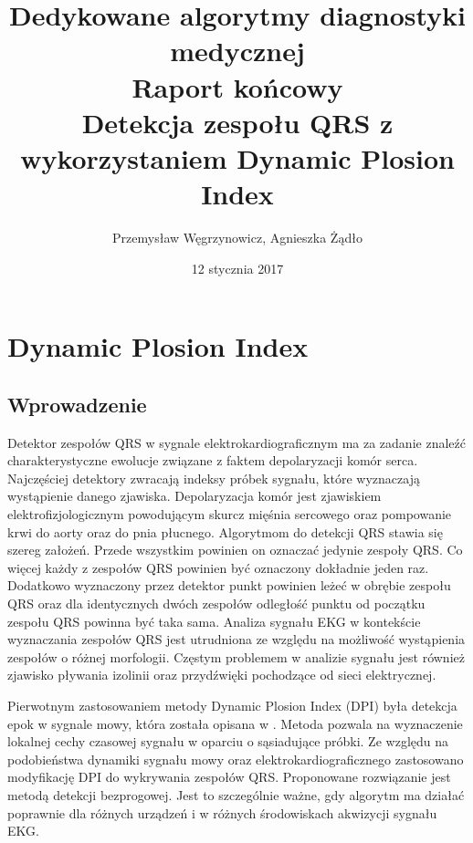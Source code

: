 \documentclass[a4paper,10pt]{article} %
\title{Dedykowane algorytmy diagnostyki medycznej\\
Raport końcowy\\
 Detekcja zespołu QRS z wykorzystaniem Dynamic Plosion Index}
\author{Przemysław Węgrzynowicz, Agnieszka Żądło}
\date{12 stycznia 2017}
\begin{document}
\maketitle

\section{Dynamic Plosion Index}

\subsection{Wprowadzenie}

Detektor zespołów QRS w sygnale elektrokardiograficznym ma za zadanie znaleźć charakterystyczne ewolucje związane z faktem depolaryzacji komór serca. Najczęściej detektory zwracają indeksy próbek sygnału, które wyznaczają wystąpienie danego zjawiska. Depolaryzacja komór jest zjawiskiem elektrofizjologicznym powodującym skurcz mięśnia sercowego oraz pompowanie krwi do aorty oraz do pnia płucnego. Algorytmom do detekcji QRS stawia się szereg założeń. Przede wszystkim powinien on oznaczać jedynie zespoły QRS. Co więcej każdy z zespołów QRS powinien być oznaczony dokładnie jeden raz. Dodatkowo wyznaczony przez detektor punkt powinien leżeć w obrębie zespołu QRS oraz dla identycznych dwóch zespołów odległość punktu od początku zespołu QRS powinna być taka sama. Analiza sygnału EKG w kontekście wyznaczania zespołów QRS jest utrudniona ze względu na możliwość wystąpienia zespołów o różnej morfologii. Częstym problemem w analizie sygnału jest również zjawisko pływania izolinii oraz przydźwięki pochodzące od sieci elektrycznej.  


Pierwotnym zastosowaniem metody Dynamic Plosion Index (DPI) była detekcja epok w sygnale mowy, która została opisana w \cite{dpi}. Metoda pozwala na wyznaczenie lokalnej cechy czasowej sygnału w oparciu o sąsiadujące próbki. Ze względu na podobieństwa dynamiki sygnału mowy oraz elektrokardiograficznego zastosowano  modyfikację DPI do wykrywania zespołów QRS. Proponowane rozwiązanie jest metodą detekcji bezprogowej. Jest to szczególnie ważne, gdy algorytm ma działać poprawnie dla różnych urządzeń i w różnych środowiskach akwizycji sygnału EKG. 
\end{document}
